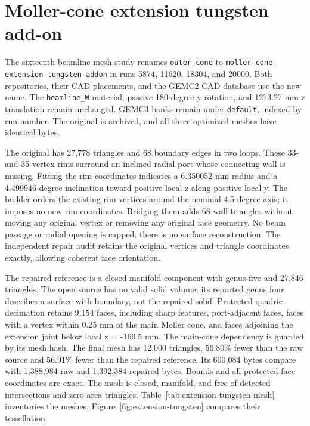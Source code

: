 \FloatBarrier
\section{Moller-cone extension tungsten add-on}
\label{sec:extension-tungsten}

The sixteenth beamline mesh study renames \texttt{outer-\allowbreak{}cone} to
\texttt{moller-\allowbreak{}cone-\allowbreak{}extension-\allowbreak{}tungsten-\allowbreak{}addon} in runs
5874, 11620, 18304, and 20000. Both repositories, their CAD placements, and the GEMC2 CAD database use the new
name. The \texttt{beamline\_W} material, passive 180-degree y rotation, and 1273.27 mm z translation remain
unchanged. GEMC3 banks remain under \texttt{default}, indexed by run number. The original is archived, and all
three optimized meshes have identical bytes.

The original has 27,778 triangles and 68 boundary edges in two loops. These 33- and 35-vertex rims surround an
inclined radial port whose connecting wall is missing. Fitting the rim coordinates indicates a 6.350052 mm
radius and a 4.499946-degree inclination toward positive local z along positive local y. The builder orders
the existing rim vertices around the nominal 4.5-degree axis; it imposes no new rim coordinates. Bridging them
adds 68 wall triangles without moving any original vertex or removing any original face geometry. No beam
passage or radial opening is capped; there is no surface reconstruction. The independent repair audit retains
the original vertices and triangle coordinates exactly, allowing coherent face orientation.

The repaired reference is a closed manifold component with genus five and 27,846 triangles. The open source
has no valid solid volume; its reported genus four describes a surface with boundary, not the repaired solid.
Protected quadric decimation retains 9,154 faces, including sharp features, port-adjacent faces, faces with a
vertex within 0.25 mm of the main Moller cone, and faces adjoining the extension joint below local z = -169.5
mm. The main-cone dependency is guarded by its mesh hash. The final mesh has 12,000 triangles, 56.80\% fewer
than the raw source and 56.91\% fewer than the repaired reference. Its 600,084 bytes compare with 1,388,984
raw and 1,392,384 repaired bytes. Bounds and all protected face coordinates are exact. The mesh is closed,
manifold, and free of detected intersections and zero-area triangles. Table~\ref{tab:extension-tungsten-mesh}
inventories the meshes; Figure~\ref{fig:extension-tungsten} compares their tessellation.

